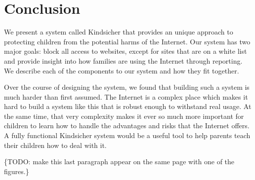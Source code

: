 
\section{Conclusion}

We present a system called Kindsicher that provides an unique approach to
protecting children from the potential harms of the Internet. Our system has
two major goals: block all access to websites, except for sites that are on a
white list and provide insight into how families are using the Internet through
reporting. We describe each of the components to our system and how they fit
together.

Over the course of designing the system, we found that building such a system
is much harder than first assumed. The Internet is a complex place which makes
it hard to build a system like this that is robust enough to withstand real
usage. At the same time, that very complexity makes it ever so much
more important for children to learn how to handle the advantages and risks
that the Internet offers.  A fully functional Kindsicher system would be a
useful tool to help parents teach their children how to deal with it.

\{TODO: make this last paragraph appear on the same page with one of the figures.\}
